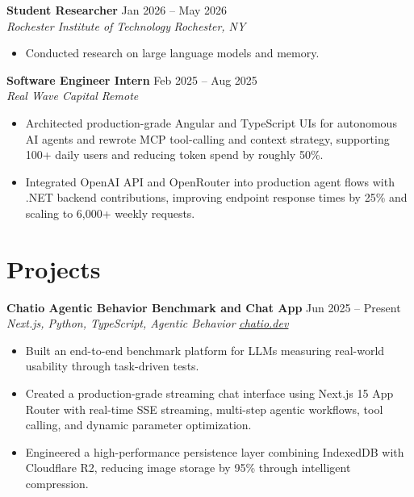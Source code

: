 \documentclass[10pt,letterpaper]{article}
\newif\ifresumeFirstRole
\newcommand{\resumeRole}[4]{%
  \ifresumeFirstRole
    \global\resumeFirstRolefalse
  \else
    \vspace{0pt plus 1fill}%
  \fi
  \textbf{#1} \hfill #2\\
  \textit{#3} \hfill \textit{#4}
}
\begin{document}
\resumeRole{Student Researcher}{Jan 2026 -- May 2026}{Rochester Institute of Technology}{Rochester, NY}
\begin{itemize}
  \item Conducted research on large language models and memory.
\end{itemize}

\resumeRole{Software Engineer Intern}{Feb 2025 -- Aug 2025}{Real Wave Capital}{Remote}
\begin{itemize}
  \item Architected production-grade Angular and TypeScript UIs for autonomous AI agents and rewrote MCP tool-calling and context strategy, supporting 100+ daily users and reducing token spend by roughly 50\%.
  \item Integrated OpenAI API and OpenRouter into production agent flows with .NET backend contributions, improving endpoint response times by 25\% and scaling to 6,000+ weekly requests.
\end{itemize}

\section*{Projects}
\resumeRole{Chatio Agentic Behavior Benchmark and Chat App}{Jun 2025 -- Present}{Next.js, Python, TypeScript, Agentic Behavior}{\href{https://chatio.dev}{chatio.dev}}
\begin{itemize}
  \item Built an end-to-end benchmark platform for LLMs measuring real-world usability through task-driven tests.
  \item Created a production-grade streaming chat interface using Next.js 15 App Router with real-time SSE streaming, multi-step agentic workflows, tool calling, and dynamic parameter optimization.
  \item Engineered a high-performance persistence layer combining IndexedDB with Cloudflare R2, reducing image storage by 95\% through intelligent compression.
\end{itemize}
\end{document}
